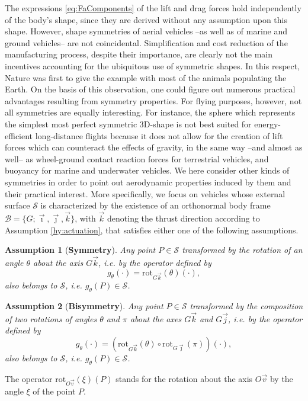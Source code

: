 \documentclass[twocolumn]{autart}
\newtheorem{hypothesis}{Assumption}
\theoremstyle{definition}
\theoremstyle{definition}
\newcommand{\rot}{\mathrm{rot}}
\begin{document}
The expressions \eqref{eq:FaComponents} of the lift and drag forces hold independently of the body's shape, since they are derived without any assumption upon this shape. However, 
shape symmetries of aerial vehicles --as well as of marine and ground vehicles-- are not coincidental. Simplification and cost reduction of the manufacturing process, despite their importance, are clearly not the main incentives accounting for the ubiquitous use of symmetric shapes. In this respect, Nature was first to give the example with most of the animals populating the Earth. On the basis of this observation, one could figure out numerous practical advantages resulting from symmetry properties. For flying purposes, however, not all symmetries are equally interesting. For instance, the sphere which represents the simplest most perfect symmetric 3D-shape is not best suited for energy-efficient long-distance flights because it does not allow for the creation of lift forces which can counteract the effects of gravity, in the same way --and almost as well-- as wheel-ground contact reaction forces for terrestrial vehicles, and buoyancy for marine and underwater vehicles. 
We here consider other kinds of symmetries in order to point out aerodynamic properties induced by them and their practical interest. More specifically, we focus on vehicles whose external surface $\mathcal{S}$ is characterized by the existence of
an orthonormal body frame $\mathcal{B} = \{G;\vec{\imath},\vec{\jmath},\vec{k}\}$, with $\vec{k}$ denoting the thrust direction according to Assumption \ref{hy:actuation}, that satisfies either one of the following assumptions. 
\begin{hypothesis}[\textbf{Symmetry}]
  \label{hy:symmetries}
  Any point $P \in \mathcal{S}$ transformed by the rotation of an angle $\theta$ about the axis $G\vec{k}$, i.e. by the operator defined by
  \[ g_\theta(\cdot) = \rot_{G\vec{k}}(\theta)(\cdot),\]
  also belongs to $\mathcal{S}$, i.e. $g_\theta(P) \in \mathcal{S}$.
\end{hypothesis}
\begin{hypothesis}[\textbf{Bisymmetry}]
  \label{hy:bisymmetries}
  Any point $P \in \mathcal{S}$ transformed by the composition of two rotations of angles $\theta$ and $\pi$ about the axes $G\vec{k}$ and $G\vec{j}$, i.e. by the operator defined by
  \[ g_\theta(\cdot) = (\rot_{G\vec{k}}(\theta) \circ \rot_{G\vec{\jmath}}(\pi))(\cdot),\]
  also belongs to $\mathcal{S}$, i.e. $g_\theta(P) \in \mathcal{S}$.
\end{hypothesis}
The operator $\rot_{O\vec{v}}(\xi)(P)$ stands for the rotation about the axis $O\vec{v}$ by the angle $\xi$ of the point $P$.
\end{document}
